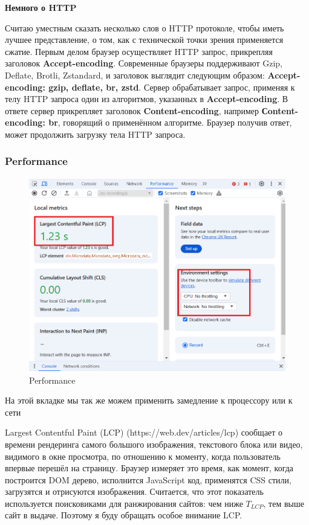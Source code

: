 \documentclass[12pt]{article}
\begin{document}
\textbf{Немного о HTTP}

Считаю уместным сказать несколько слов о HTTP протоколе, чтобы иметь лучшее представление,
о том, как с технической точки зрения применяется сжатие.
Первым делом браузер осуществляет HTTP запрос, прикрепляя заголовок \textbf{Accept-encoding}.
Современные браузеры поддерживают Gzip, Deflate, Brotli, Zstandard,
и заголовок выглядит следующим
образом: \textbf{Accept-encoding: gzip, deflate, br, zstd}.
Сервер обрабатывает запрос, применяя к телу HTTP запроса один из алгоритмов,
указанных в \textbf{Accept-encoding}. В ответе сервер прикрепляет заголовок \textbf{Content-encoding},
например \textbf{Сontent-encoding: br}, говорящий о применённом алгоритме. Браузер получив ответ,
может продолжить загрузку тела HTTP запроса.

\subsubsection{Performance}

\begin{figure}[H]
    \centering
    \includegraphics[width=1\textwidth]{../images/performance.png}
    \caption{Performance}
\end{figure}

На этой вкладке мы так же можем применить замедление к процессору или к сети

Largest Contentful Paint (LCP) (https://web.dev/articles/lcp) сообщает о времени рендеринга
самого большого изображения, текстового блока или видео,
видимого в окне просмотра, по отношению к моменту,
когда пользователь впервые перешёл на страницу.
Браузер измеряет это время, как момент, когда построится DOM дерево,
исполнится JavaScript код, применятся CSS стили, загрузятся и отрисуются изображения.
Считается, что этот показатель используется поисковиками для ранжирования сайтов: чем ниже $T_{LCP}$,
тем выше сайт в выдаче.
Поэтому я буду обращать особое внимание LCP.
\end{document}
